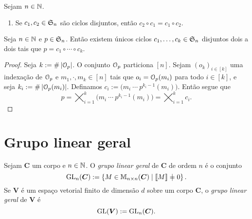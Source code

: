 \begin{proposition}
	Sejam $n \in \mathbb{N}$.
	\begin{enumerate}
	\item Se $c_1,c_2 \in \mathfrak{S}_n$ são ciclos disjuntos, então $c_2 \circ c_1 = c_1 \circ c_2$.
	\end{enumerate}
\end{proposition}

\begin{proposition}
	Seja $n \in \mathbb{N}$ e $p \in \mathfrak{S}_n$. Então existem únicos ciclos $c_1,\ldots,c_k \in \mathfrak{S}_n$ disjuntos dois a dois tais que $p=c_1 \circ \cdots \circ c_k$.
\end{proposition}
\begin{proof}
	Seja $k := \#\left\lvert{\mathcal{O}_p}\right\rvert$. O conjunto $\mathcal{O}_p$ particiona $[n]$. Sejam $(o_k)_{i \in [k]}$ uma indexação de $\mathcal{O}_p$ e $m_1,\cdot,m_k \in [n]$ tais que $o_i=\mathcal{O}_p(m_i)$ para todo $i \in [k]$, e seja $k_i := \#\left\lvert{\mathcal{O}_p(m_i)}\right\rvert$. Definamos $c_i :=  \bigl( m_i \ \cdots \  p^{k_i-1}(m_i)\bigr)$. Então segue que
	\begin{equation*}
	p = \bigtimes_{i=1}^k \bigl( m_i \ \cdots \  p^{k_i-1}(m_i)\bigr) = \bigtimes_{i=1}^k c_i.
	\end{equation*}
\end{proof}












\section{Grupo linear geral}

\begin{definition}
Sejam $\bm C$ um corpo e $n \in \mathbb{N}$. O \emph{grupo linear geral} de $\bm C$ de ordem $n$ é o conjunto
	\begin{equation*}
	\GL_n(\bm C) := \set{M \in \M_{n\times n}(\bm C)}{\det M \neq 0}.
	\end{equation*}
Se $\bm V$ é um espaço vetorial finito de dimensão $d$ sobre um corpo $\bm C$, o \emph{grupo linear geral} de $\bm V$ é
	\begin{equation*}
	\operatorname{GL}(\bm V) := \operatorname{GL}_n(\bm C).
	\end{equation*}
\end{definition}

